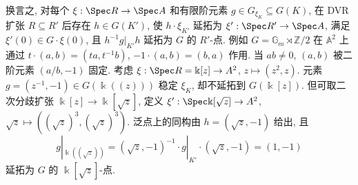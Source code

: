 \begin{remark}\label{src:7.10.25}
换言之, 对每个 $\xi:\Spec R\to\Spec A$ 和有限阶元素 $g\in G_{\xi_K}\subseteq G(K)$, 在 DVR 扩张 $R\subseteq R'$ 后存在 $h\in G(K')$, 使 $h\cdot\xi_{K'}$ 延拓为 $\xi':\Spec R'\to\Spec A$, 满足 $\xi'(0)\in G\cdot\xi(0)$, 且 $h^{-1}g|_{K'}h$ 延拓为 $G$ 的 $R'$-点. 例如 $G=\mathbb G_m\rtimes\mathbb Z/2$ 在 $\mathbb A^2$ 上通过 $t\cdot(a,b)=(ta,t^{-1}b)$, $-1\cdot(a,b)=(b,a)$ 作用. 当 $ab\ne0$, $(a,b)$ 被二阶元素 $(a/b,-1)$ 固定. 考虑 $\xi:\Spec R=\Bbbk[z]\to\mathbb A^2$, $z\mapsto(z^2,z)$. 元素 $g=(z^{-1},-1)\in G(\Bbbk((z)))$ 稳定 $\xi_K$, 却不延拓到 $G(\Bbbk[z])$. 但可取二次分歧扩张 $\Bbbk[z]\to\Bbbk[\sqrt z]$, 定义 $\xi':\Spec\Bbbk[\sqrt z]\to\mathbb A^2$, $\sqrt z\mapsto((\sqrt z)^3,(\sqrt z)^3)$. 泛点上的同构由 $h=(\sqrt z,-1)$ 给出, 且
\[g|_{\Bbbk((\sqrt z))}=(\sqrt z,-1)^{-1}\cdot g|_{K'}\cdot(\sqrt z,-1)=(1,-1)\]
延拓为 $G$ 的 $\Bbbk[\sqrt z]$-点.
\end{remark}
